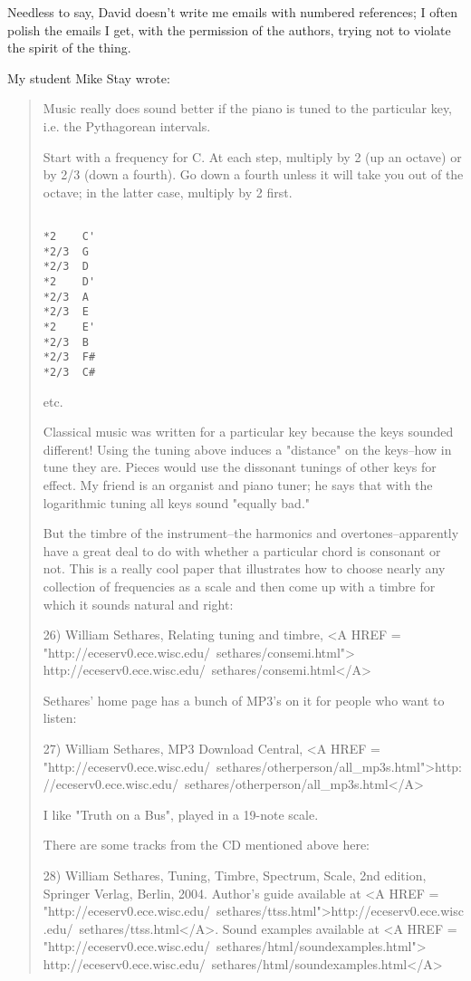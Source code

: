 Needless to say, David doesn't write me emails with numbered
references; I often polish the emails I get, with the permission
of the authors, trying not to violate the spirit of the thing.

My student Mike Stay wrote:

\begin{quote}
Music really does sound better if the piano is tuned to the particular
key, i.e. the Pythagorean intervals.

Start with a frequency for C.  At each step, multiply by 2 (up an
octave) or by 2/3 (down a fourth).  Go down a fourth unless it
will take you out of the octave; in the latter case, multiply by 2
first.

\begin{verbatim}

*2    C'
*2/3  G
*2/3  D
*2    D'
*2/3  A
*2/3  E
*2    E'
*2/3  B
*2/3  F#
*2/3  C#
\end{verbatim}
    
etc.

Classical music was written for a particular key because the keys
sounded different!  Using the tuning above induces a "distance" on the
keys--how in tune they are.  Pieces would use the dissonant tunings of
other keys for effect.  My friend is an organist and piano tuner; he
says that with the logarithmic tuning all keys sound "equally bad."

But the timbre of the instrument--the harmonics and
overtones--apparently have a great deal to do with whether a
particular chord is consonant or not.  This is a really cool paper
that illustrates how to choose nearly any collection of frequencies as
a scale and then come up with a timbre for which it sounds natural and
right:

26) William Sethares, Relating tuning and timbre,
<A HREF = "http://eceserv0.ece.wisc.edu/~sethares/consemi.html">
http://eceserv0.ece.wisc.edu/~sethares/consemi.html</A>

Sethares' home page has a bunch of MP3's on it for people who want to listen:

27) William Sethares, MP3 Download Central,
<A HREF = "http://eceserv0.ece.wisc.edu/~sethares/otherperson/all_mp3s.html">http://eceserv0.ece.wisc.edu/~sethares/otherperson/all_mp3s.html</A>

I like "Truth on a Bus", played in a 19-note scale.

There are some tracks from the CD mentioned above here:

28) William Sethares, Tuning, Timbre, Spectrum, Scale, 2nd
edition, Springer Verlag, Berlin, 2004.  Author's guide available at
<A HREF = "http://eceserv0.ece.wisc.edu/~sethares/ttss.html">http://eceserv0.ece.wisc.edu/~sethares/ttss.html</A>.
Sound examples available at
<A HREF = "http://eceserv0.ece.wisc.edu/~sethares/html/soundexamples.html">
http://eceserv0.ece.wisc.edu/~sethares/html/soundexamples.html</A>


\end{quote}
